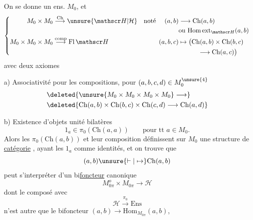 On se donne un ens. $M_0$, et
\[
\left\{\begin{aligned}
M_0\times M_0&\overset{\mathrm{Ch}}{\longrightarrow}\unsure{\mathscr H|\mathcal H}&\text{noté }\quad(a,b)&\longrightarrow\mathrm{Ch}(a,b)\\
&&&\text{ou }\mathrm{Hom}\,\mathrm{ext}_{\mathscr H}(a,b)\\
M_0\times M_0\times M_0&\overset{\mathrm{comp}}{\longrightarrow}\mathrm{Fl}\,\mathscr H &(a,b,c)&\mapsto\bigl(\mathrm{Ch}(a,b)\times\mathrm{Ch}(b,c)\\
&&&\hspace{3em}\longrightarrow\mathrm{Ch}(a,c)\bigr)
\end{aligned}\right.
\]
avec deux axiomes

a) Associativité pour les compositions, pour $(a,b,c,d)\in M_0^{\unsure{4}}$
\[
\begin{aligned}
&\deleted{\unsure{M_0\times M_0\times M_0\times M_0}\longrightarrow}\\
&\deleted{\mathrm{Ch}(a,b)\times\mathrm{Ch}(b,c)\times\mathrm{Ch}(c,d)\longrightarrow\mathrm{Ch}(a,d)}
\end{aligned}
\]

b) Existence d'objets unité bilatères
\[
1_a\in\pi_0(\mathrm{Ch}(a,a))\qquad\text{pour tt }a\in M_0.
\]
Alors les $\pi_0(\mathrm{Ch}(a,b))$ et leur composition définissent sur $M_0$\deleted{\unsure{,}}  une structure de \uline{catégorie} , ayant les $1_a$ comme identités, et on trouve que
\[
(a,b)\unsure{\vdash|\mapsto}\mathrm{Ch}(a,b)
\]
peut s'interpréter  d'un bi\uline{foncteur} canonique
\[
M_{0\pi}^{o}\times M_{0\pi}\longrightarrow\mathscr H
\]
dont le composé avec
\[
\mathscr H\xrightarrow{\pi_0}\mathrm{Ens}
\]
n'est autre que le bifoncteur $(a,b)\longrightarrow\mathrm{Hom}_{M_{0\pi}}(a,b)$,

